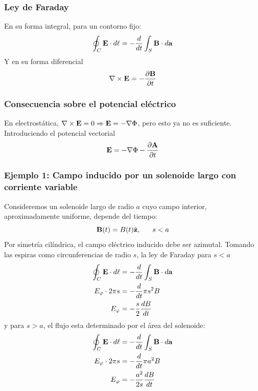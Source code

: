 \documentclass[]{article}
\numberwithin{equation}{section}
\begin{document}
\subsubsection{Ley de Faraday}
En su forma integral, para un contorno fijo:
\begin{equation}
	\oint_{C} \mathbf{E}\cdot d\ell = - \dfrac{d }{d t} \int_{S}\mathbf{B}\cdot d\mathbf{a} \label{Faraday_int}
\end{equation}
Y en su forma diferencial
\begin{equation}
	\nabla\times\mathbf{E} = - \dfrac{\partial \mathbf{B}}{\partial t} \label{Faraday_dif}
\end{equation}

\subsubsection{Consecuencia sobre el potencial eléctrico}
En electrostática, \(\nabla\times\mathbf{E} = 0 \Rightarrow \mathbf{E} = -\nabla\Phi\), pero esto ya no es suficiente. Introduciendo el potencial vectorial
\begin{equation}
	\mathbf{E} = -\nabla\Phi - \dfrac{\partial \mathbf{A}}{\partial t}
\end{equation}

\subsubsection{Ejemplo 1: Campo inducido por un solenoide largo con corriente variable}
Consideremos un solenoide largo de radio \(a\) cuyo campo interior, aproximadamente uniforme, depende del tiempo:
\begin{equation*}
	\mathbf{B}(t) = B(t)\hat{\mathbf{z}}, ~~~~~ s < a
\end{equation*}
Por simetría cilíndrica, el campo eléctrico inducido debe ser azimutal. Tomando las espiras como circunferencias de radio \(s\), la ley de Faraday para \(s < a\)
\begin{align}
	\oint_{C} \mathbf{E}\cdot d\ell &= - \dfrac{d }{d t} \int_{S}\mathbf{B}\cdot d\mathbf{a}\nonumber\\
	E_{\varphi} \cdot 2\pi s &= - \dfrac{d }{d t} \pi s^2 B \nonumber\\
	E_{\varphi} &= - \frac{s}{2} \dfrac{d B}{d t}
\end{align}
y para \(s > a\), el flujo esta determinado por el área del solenoide:
\begin{align}
	\oint_{C} \mathbf{E}\cdot d\ell &= - \dfrac{d }{d t} \int_{S}\mathbf{B}\cdot d\mathbf{a}\nonumber\\
	E_{\varphi} \cdot 2\pi s &= - \dfrac{d }{d t} \pi a^2 B \nonumber\\
	E_{\varphi} &= - \frac{a^2}{2 s} \dfrac{d B}{d t}
\end{align}
\end{document}
